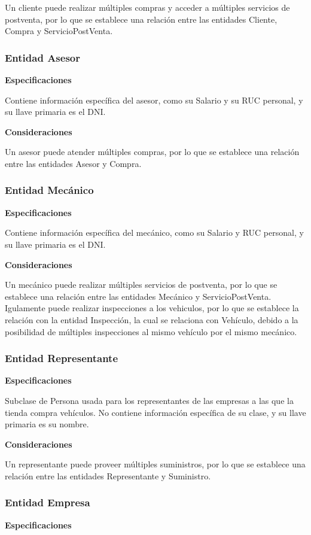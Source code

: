 \documentclass[12pt]{article}
\begin{document}
Un cliente puede realizar múltiples compras y acceder a múltiples servicios de postventa, por lo que se establece una relación entre las entidades Cliente, Compra y ServicioPostVenta.

\subsubsection{Entidad Asesor}
\textbf{Especificaciones}

Contiene información específica del asesor, como su Salario y su RUC personal, y su llave primaria es el DNI.

\textbf{Consideraciones}

Un asesor puede atender múltiples compras, por lo que se establece una relación entre las entidades Asesor y Compra. 

\subsubsection{Entidad Mecánico}
\textbf{Especificaciones}

Contiene información específica del mecánico, como su Salario y RUC personal, y su llave primaria es el DNI.

\textbf{Consideraciones}

Un mecánico puede realizar múltiples servicios de postventa, por lo que se establece una relación entre las entidades Mecánico y ServicioPostVenta. Igulamente puede realizar inspecciones a los vehiculos, por lo que se establece la relación con la entidad Inspección, la cual se relaciona con Vehículo, debido a la posibilidad de múltiples inspecciones al mismo vehículo por el mismo mecánico.

\subsubsection{Entidad Representante}
\textbf{Especificaciones}

Subclase de Persona usada para los representantes de las empresas a las que la tienda compra vehículos. No contiene información específica de su clase, y su llave primaria es su nombre.

\textbf{Consideraciones}

Un representante puede proveer múltiples suministros, por lo que se establece una relación entre las entidades Representante y Suministro.

\subsubsection{Entidad Empresa}
\textbf{Especificaciones}
\end{document}
